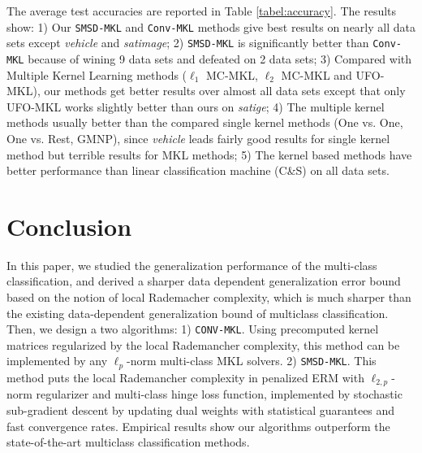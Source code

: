 \documentclass{article}
\begin{document}
The average test accuracies are reported in Table \ref{tabel:accuracy}.
The results show: 1) Our \texttt{SMSD-MKL} and \texttt{Conv-MKL} methods give best results on nearly all data sets
except \textit{vehicle} and \textit{satimage}; 
2) \texttt{SMSD-MKL} is significantly better than \texttt{Conv-MKL} because of wining 9 data sets and defeated on 2 data sets;
3) Compared with Multiple Kernel Learning methods ($\ell_1$ MC-MKL, $\ell_2$ MC-MKL and UFO-MKL), 
our methods get better results over almost all data sets except that only UFO-MKL works slightly better than ours on \textit{satige}; 
4) The multiple kernel methods usually better than the compared single kernel methods (One vs. One, One vs. Rest, GMNP),
since \textit{vehicle} leads fairly good results for single kernel method but terrible results for MKL methods; 
5) The kernel based methods have better performance than linear classification machine (C\&S) on all data sets.

\section{Conclusion}
In this paper, we studied the generalization performance of the multi-class classification,
and derived a sharper data dependent generalization error bound based on the notion of local Rademacher complexity,
which is much sharper than the existing data-dependent generalization bound of multiclass classification.
Then, we design a two algorithms: 1) \texttt{CONV-MKL}.
Using precomputed kernel matrices regularized by the local Rademancher complexity,
this method can be implemented by any $\ell_p$-norm multi-class MKL solvers.
2) \texttt{SMSD-MKL}.
This method puts the local Rademancher complexity
in penalized ERM with $\ell_{2,p}$-norm regularizer and multi-class hinge loss function,
implemented by stochastic sub-gradient descent by updating
dual weights with statistical guarantees and fast convergence rates.
Empirical results show our algorithms outperform the state-of-the-art multiclass classification methods.


\end{document}
